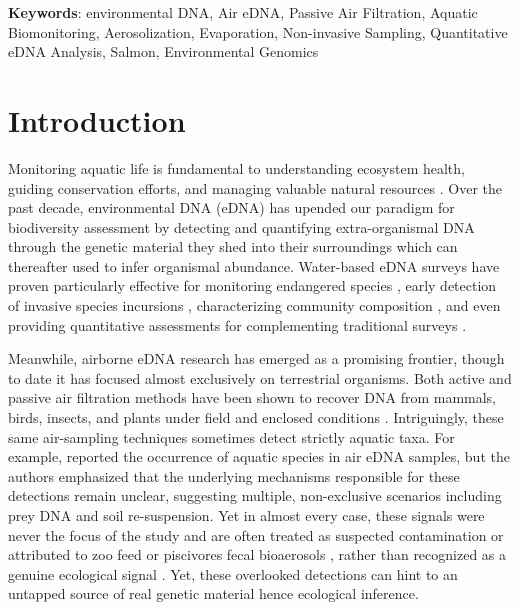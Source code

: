 \documentclass{article}
\begin{document}
\textbf{Keywords}: environmental DNA, Air eDNA, Passive Air Filtration, Aquatic Biomonitoring, Aerosolization, Evaporation, Non-invasive Sampling, Quantitative eDNA Analysis, Salmon, Environmental Genomics

\section{Introduction}
Monitoring aquatic life is fundamental to understanding ecosystem health, guiding conservation efforts, and managing valuable natural resources \cite{dudgeon2006, reid2019}. Over the past decade, environmental DNA (eDNA) has upended our paradigm for biodiversity assessment by detecting and quantifying extra-organismal DNA through the genetic material they shed into their surroundings which can thereafter used to infer organismal abundance. Water-based eDNA surveys have proven particularly effective for monitoring endangered species \cite{biggs2015}, early detection of invasive species incursions \cite{thomas2020}, characterizing community composition \cite{wilkinson2024}, and even providing quantitative assessments for complementing traditional surveys \cite{allan2023, guri2024a, tillotson2018}. 

Meanwhile, airborne eDNA research has emerged as a promising frontier, though to date it has focused almost exclusively on terrestrial organisms. Both active and passive air filtration methods have been shown to recover DNA from mammals, birds, insects, and plants under field and enclosed conditions \cite{clare2021, garrett2023, johnson2019, johnson2023, lynggaard2024, roger2022, lynggaard2022}. Intriguingly, these same air-sampling techniques sometimes detect strictly aquatic taxa. For example, \cite{tournayre2025} reported the occurrence of aquatic species in air eDNA samples, but the authors emphasized that the underlying mechanisms responsible for these detections remain unclear, suggesting multiple, non-exclusive scenarios including prey DNA and soil re-suspension. Yet in almost every case, these signals were never the focus of the study and are often treated as suspected contamination or attributed to zoo feed or piscivores fecal bioaerosols \cite{sullivan2023, klepke2022, lynggaard2023, lynggaard2022}, rather than recognized as a genuine ecological signal \cite{tournayre2025}. Yet, these overlooked detections can hint to an untapped source of real genetic material hence ecological inference. 
\end{document}
